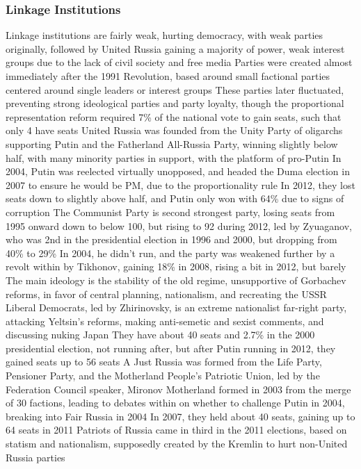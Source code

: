 \documentclass[11 pt, twoside]{article}
\newenvironment{outline*}
{
	\begin{outline}[enumerate]
	}
	{\end{outline}
}
\begin{document}
\subsubsection{Linkage Institutions}
\begin{outline*}
\1 Linkage institutions are fairly weak, hurting democracy, with weak parties originally, followed by United Russia gaining a majority of power, weak interest groups due to the lack of civil society and free media
\1 Parties were created almost immediately after the 1991 Revolution, based around small factional parties centered around single leaders or interest groups
\2 These parties later fluctuated, preventing strong ideological parties and party loyalty, though the proportional representation reform required 7\% of the national vote to gain seats, such that only 4 have seats
\2 United Russia was founded from the Unity Party of oligarchs supporting Putin and the Fatherland All-Russia Party, winning slightly below half, with many minority parties in support, with the platform of pro-Putin
\3 In 2004, Putin was reelected virtually unopposed, and headed the Duma election in 2007 to ensure he would be PM, due to the proportionality rule
\3 In 2012, they lost seats down to slightly above half, and Putin only won with 64\% due to signs of corruption
\2 The Communist Party is second strongest party, losing seats from 1995 onward down to below 100, but rising to 92 during 2012, led by Zyuaganov, who was 2nd in the presidential election in 1996 and 2000, but dropping from 40\% to 29\%
\3 In 2004, he didn't run, and the party was weakened further by a revolt within by Tikhonov, gaining 18\% in 2008, rising a bit in 2012, but barely
\3 The main ideology is the stability of the old regime, unsupportive of Gorbachev reforms, in favor of central planning, nationalism, and recreating the USSR
\2 Liberal Democrats, led by Zhirinovsky, is an extreme nationalist far-right party, attacking Yeltsin's reforms, making anti-semetic and sexist comments, and discussing nuking Japan
\3 They have about 40 seats and 2.7\% in the 2000 presidential election, not running after, but after Putin running in 2012, they gained seats up to 56 seats
\2 A Just Russia was formed from the Life Party, Pensioner Party, and the Motherland People's Patriotic Union, led by the Federation Council speaker, Mironov
\3 Motherland formed in 2003 from the merge of 30 factions, leading to debates within on whether to challenge Putin in 2004, breaking into Fair Russia in 2004
\3 In 2007, they held about 40 seats, gaining up to 64 seats in 2011
\2 Patriots of Russia came in third in the 2011 elections, based on statism and nationalism, supposedly created by the Kremlin to hurt non-United Russia parties

\end{outline*}
\end{document}
